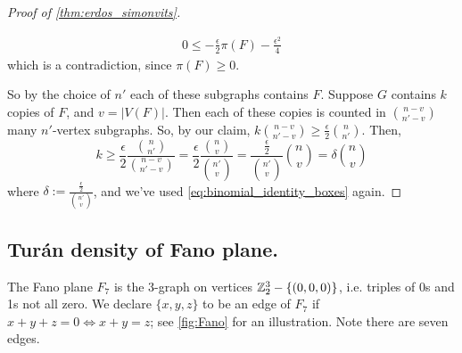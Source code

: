 \begin{proof}[Proof of \cref{thm:erdos_simonvits}]
\begin{subproof}
\begin{gather*}
0 \leq - \frac{\epsilon}{2}\pi(F) - \frac{\epsilon^2}{4}
\end{gather*}
which is a contradiction, since $\pi(F)\geq 0$.
\end{subproof}
So by the choice of $n'$ each of these subgraphs contains $F$. Suppose $G$ contains $k$ copies of $F$, and $v = |V(F)|$. Then each of these copies is counted in ${n-v \choose n'-v}$ many $n'$-vertex subgraphs. So, by our claim, $k {n-v \choose n'-v} \geq \frac{\epsilon}{2}{n\choose n'}$. Then,
\[
k\geq \frac{\epsilon}{2} \frac{{n\choose n'}}{{n-v\choose n'-v}} = \frac{\epsilon}{2} \frac{{n\choose v}}{{n' \choose v}} = \frac{\frac{\epsilon}{2}}{{n' \choose v}} {n \choose v} = \delta {n \choose v}
\]
where $\delta := \frac{\frac{\epsilon}{2}}{{n' \choose v}}$, and we've used \cref{eq:binomial_identity_boxes} again.
\end{proof}


\subsection{Tur\'an density of Fano plane.} 
The Fano plane $F_7$ is the 3-graph on vertices $\mathbb{Z}_2^3 - \{(0,0,0)\}$, i.e. triples of 0s and 1s not all zero. We declare $\{x,y,z\}$ to be an edge of $F_7$ if $x+y+z = 0 \iff x+y=z$; see \cref{fig:Fano} for an illustration. Note there are seven edges.
\begin{marginfigure}
\begin{center}
\end{center}
\caption{A depiction of the Fano plane $F_7$. Each straight line is an edge, and the circle is an edge; each edge contains exactly 3 vertices, since $F_7$ is a 3-graph.} \label{fig:Fano}
\end{marginfigure}


